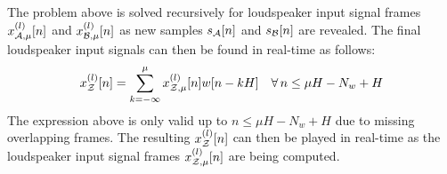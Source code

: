 The problem above is solved recursively for loudspeaker input signal frames $x_{\mathcal{A},\mu}^{(l)}[n]$ and $x_{\mathcal{B},\mu}^{(l)}[n]$ as new samples $s_{\mathcal{A}}[n]$ and $s_{\mathcal{B}}[n]$ are revealed.
The final loudspeaker input signals can then be found in real-time as follows: 
\begin{equation}
    x^{(l)}_{\mathcal{Z}}[n] = \sum_{k=-\infty}^{\mu} x^{(l)}_{\mathcal{Z},\mu}[n] w[n - kH]\quad \forall\,n \leq \mu H - N_w + H
\end{equation}
The expression above is only valid up to $n \leq \mu H - N_w + H$ due to missing overlapping frames.
The resulting $x^{(l)}_{\mathcal{Z}}[n]$ can then be played in real-time as the loudspeaker input signal frames $x^{(l)}_{\mathcal{Z},\mu}[n]$ are being computed.
